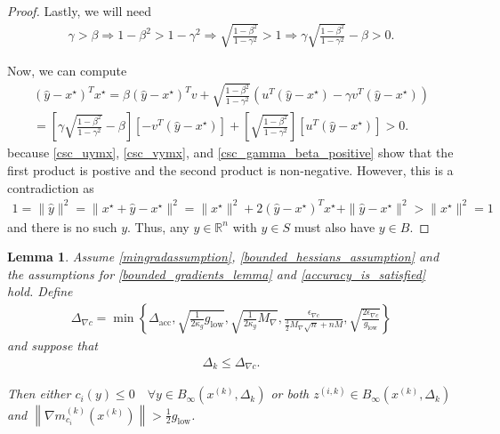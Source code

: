 \documentclass{article}
\newtheorem{lemma}[theorem]{Lemma}
\theoremstyle{case}
\newcommand{\maxgrad}{{M_{\nabla}}}
\newcommand{\dacc}{{\Delta_{\text{acc}}}}
\newcommand{\xk}{{x^{(k)}}}
\newcommand{\Rn}{\mathbb R^n}
\newcommand{\dk}{\Delta_k}
\newcommand{\zik}{{z^{(i, k)}}}
\newcommand{\gmcik}{{\nabla m_{c_i}^{(k)}(\xk)}}
\newcommand{\tr}{{ B_{\infty}\left(\xk, \dk\right) }}
\newcommand{\mingradepsilon}{{\epsilon_{\nabla c}}}
\newcommand{\mingraddelta}{{\Delta_{\nabla c}}}
\newcommand{\mingrad}{{ g_{\text{low}} }}
\begin{document}
\begin{proof}
Lastly, we will need
\begin{align}
\gamma > \beta 
\Longrightarrow 1 - \beta^2 > 1 - \gamma^2
\Longrightarrow \sqrt{\frac{1 - \beta^2}{1 - \gamma^2}} > 1
\Longrightarrow \gamma \sqrt{\frac{1 - \beta^2}{1 - \gamma^2}} - \beta > 0. \label{csc_gamma_beta_positive}
\end{align}

Now, we can compute
\begin{align*}
{\left(\hat y - x^{\star}\right)}^Tx^{\star} = 
\beta {\left(\hat y - x^{\star}\right)}^Tv
+ \sqrt{\frac{1 - \beta^2}{1 - \gamma^2}} 
\left(u^T\left(\hat y - x^{\star}\right) - \gamma v^T \left(\hat y - x^{\star}\right) \right)\\ 
= \left[\gamma \sqrt{\frac{1 - \beta^2}{1 - \gamma^2}} - \beta\right] \left[-v^T\left(\hat y - x^{\star}\right)\right]
+ \left[\sqrt{\frac{1 - \beta^2}{1 - \gamma^2}}\right] \left[u^T\left(\hat y - x^{\star}\right) \right] > 0.
\end{align*}
because \cref{csc_uymx}, \cref{csc_vymx}, and \cref{csc_gamma_beta_positive} show that the first product is postive and the second product is non-negative.
However, this is a contradiction as
\begin{align*}
1 = \|\hat y\|^2 = \|x^{\star} + \hat y - x^{\star}\|^2 = \|x^{\star}\|^2 + 2{\left(\hat y - x^{\star}\right)}^Tx^{\star} + \|\hat y - x^{\star}\|^2 > \|x^{\star}\|^2 = 1
\end{align*}
and there is no such $y$.
Thus, any $y \in\Rn$ with $y \in S$ must also have $y \in B$.
\end{proof}

\begin{lemma}
\label{only_small_z_matters}
Assume \cref{mingradassumption}, \cref{bounded_hessians_assumption}
and the assumptions for \cref{bounded_gradients_lemma} and \cref{accuracy_is_satisfied} hold.
Define
\begin{align}
\mingraddelta = \min\left\{
\dacc,
\sqrt{\frac 1 {2\kappa_g} \mingrad},
\sqrt{\frac 1 {2\kappa_g} \maxgrad},
\frac{\mingradepsilon}{\frac 3 2 \maxgrad\sqrt{n} + nM},
\sqrt{\frac{2\mingradepsilon}{\mingrad}}
\right\} \label{define_mingraddelta}
\end{align}
and suppose that
\begin{align}
\dk \le \mingraddelta \label{szm_delta_small}.
\end{align}

Then either $c_i(y) \le 0 \quad \forall y \in \tr$ or both $\zik \in \tr$ and $\left\|\gmcik\right\| > \frac 1 2 \mingrad$.
\end{lemma}
\end{document}
